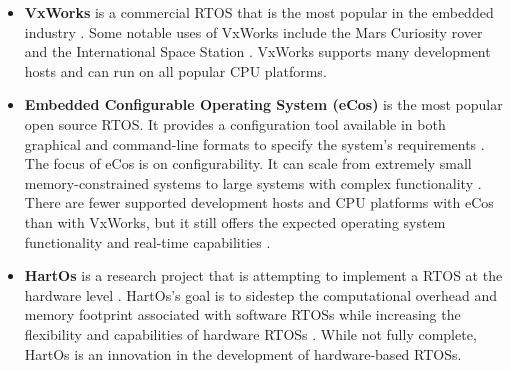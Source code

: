                 \begin{itemize}
                    \item
                        \textbf{VxWorks} is a commercial RTOS that is the most
                            popular in the embedded industry
                            \cite{rtos-overview}.
                        Some notable uses of VxWorks include the Mars Curiosity
                            rover \cite{vsworks-curiosity} and the International
                            Space Station \cite{rtos-overview}.
                        VxWorks supports many development hosts and can run on
                            all popular CPU platforms.
                    \item
                        \textbf{Embedded Configurable Operating System (eCos)}
                            is the most popular open source RTOS.
                        \sloppy It provides a configuration tool available in
                            both graphical and command-line formats to specify
                            the system's requirements \cite{rtos-overview}.
                        The focus of eCos is on configurability.
                        It can scale from extremely small memory-constrained
                            systems to large systems with complex functionality
                            \cite{ecos-overview}.
                        There are fewer supported development hosts and CPU
                            platforms with eCos than with VxWorks, but it still
                            offers the expected operating system functionality
                            and real-time capabilities \cite{rtos-overview}.
                    \item
                        \textbf{HartOs} is a research project that is attempting
                            to implement a RTOS at the hardware level
                            \cite{hartos}.
                        HartOs's goal is to sidestep the computational overhead
                            and memory footprint associated with software RTOSs
                            while increasing the flexibility and capabilities of
                            hardware RTOSs \cite{hartos}.
                        While not fully complete, HartOs is an innovation in the
                            development of hardware-based RTOSs.
                \end{itemize}
